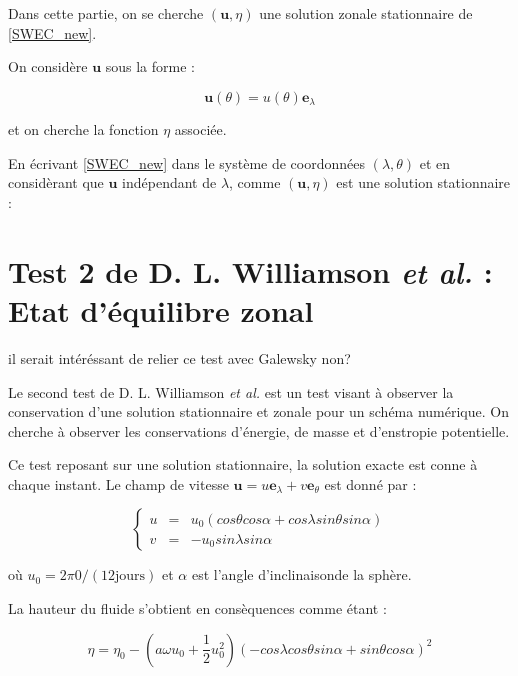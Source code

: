 Dans cette partie, on se cherche $(\mathbf{u}, \eta)$ une solution zonale stationnaire de \eqref{SWEC_new}.

On considère $\mathbf{u}$ sous la forme :

\begin{equation}
\mathbf{u}(\theta) = u(\theta) \mathbf{e}_{\lambda}
\end{equation}

et on cherche la fonction $\eta$ associée.

En écrivant \eqref{SWEC_new} dans le système de coordonnées $(\lambda, \theta)$ et en considèrant que $\mathbf{u}$ indépendant de $\lambda$, comme $(\mathbf{u}, \eta)$ est une solution stationnaire :



\section{Test 2 de D. L. Williamson \textit{et al.} : Etat d'équilibre zonal}

\begin{com}
il serait intéréssant de relier ce test avec Galewsky non?
\end{com}

Le second test de D. L. Williamson \textit{et al.} \cite{Williamson1992} est un test visant à observer la conservation d'une solution stationnaire et zonale pour un schéma numérique. On cherche à observer les conservations d'énergie, de masse et d'enstropie potentielle.

Ce test reposant sur une solution stationnaire, la solution exacte est conne à chaque instant. Le champ de vitesse $\mathbf{u} = u \mathbf{e}_{\lambda} + v \mathbf{e}_{\theta}$ est donné par :

\begin{equation}
\left\lbrace
\begin{array}{rcl}
u & = & u_0 \left( cos \theta cos \alpha + cos \lambda sin \theta sin \alpha \right)\\
v & = & - u_0 sin \lambda sin \alpha
\end{array}
\right.
\label{eq:williamson2_u}
\end{equation}

où $u_0 = 2 \pi 0 / (12 \text{jours} )$ et $\alpha$ est l'angle d'inclinaisonde  la sphère.

La hauteur du fluide s'obtient en consèquences comme étant :

\begin{equation}
\eta = \eta_0 - \left( a \omega u_0 + \dfrac{1}{2}u_0^2 \right) \left( -cos \lambda cos \theta sin \alpha + sin \theta cos \alpha \right)^2
\label{eq:williamson2_h}
\end{equation}

